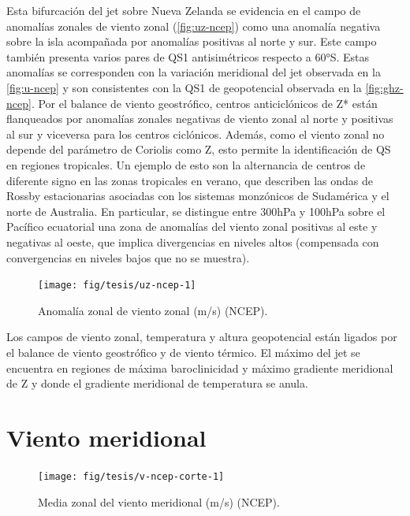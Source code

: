 \documentclass[spanish,a4paper,12pt,oneside]{book}
\begin{document}
Esta bifurcación del jet sobre Nueva Zelanda se evidencia en el campo de
anomalías zonales de viento zonal (\autoref{fig:uz-ncep}) como una
anomalía negativa sobre la isla acompañada por anomalías positivas al
norte y sur. Este campo también presenta varios pares de QS1
antisimétricos respecto a 60°S. Estas anomalías se corresponden con la
variación meridional del jet observada en la \autoref{fig:u-ncep} y son
consistentes con la QS1 de geopotencial observada en la
\autoref{fig:ghz-ncep}. Por el balance de viento geostrófico, centros
anticiclónicos de Z* están flanqueados por anomalías zonales negativas
de viento zonal al norte y positivas al sur y viceversa para los centros
ciclónicos. Además, como el viento zonal no depende del parámetro de
Coriolis como Z, esto permite la identificación de QS en regiones
tropicales. Un ejemplo de esto son la alternancia de centros de
diferente signo en las zonas tropicales en verano, que describen las
ondas de Rossby estacionarias asociadas con los sistemas monzónicos de
Sudamérica y el norte de Australia. En particular, se distingue entre
300hPa y 100hPa sobre el Pacífico ecuatorial una zona de anomalías del
viento zonal positivas al este y negativas al oeste, que implica
divergencias en niveles altos (compensada con convergencias en niveles
bajos que no se muestra).

\begin{landscape}\begin{figure}

{\centering \texttt{[image: fig/tesis/uz-ncep-1]} 

}

\caption{Anomalía zonal de viento zonal (m/s) (NCEP).}\label{fig:uz-ncep}
\end{figure}
\end{landscape}

Los campos de viento zonal, temperatura y altura geopotencial están
ligados por el balance de viento geostrófico y de viento térmico. El
máximo del jet se encuentra en regiones de máxima baroclinicidad y
máximo gradiente meridional de Z y donde el gradiente meridional de
temperatura se anula.

\section{Viento meridional}\label{viento-meridional}

\begin{figure}
\texttt{[image: fig/tesis/v-ncep-corte-1]} \caption{Media zonal del viento meridional (m/s) (NCEP).}\label{fig:v-ncep-corte}
\end{figure}
\end{document}
